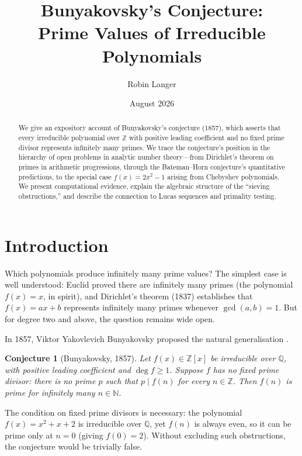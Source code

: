 \documentclass[11pt,a4paper]{article}
\title{Bunyakovsky's Conjecture:\\Prime Values of Irreducible Polynomials}
\author{Robin Langer}
\date{August 2026}
\newtheorem{conjecture}[theorem]{Conjecture}
\newcommand{\Z}{\mathbb{Z}}
\newcommand{\N}{\mathbb{N}}
\newcommand{\Q}{\mathbb{Q}}
\begin{document}
\maketitle

\begin{abstract}
We give an expository account of Bunyakovsky's conjecture (1857), which asserts that every irreducible polynomial over $\Z$ with positive leading coefficient and no fixed prime divisor represents infinitely many primes. We trace the conjecture's position in the hierarchy of open problems in analytic number theory---from Dirichlet's theorem on primes in arithmetic progressions, through the Bateman--Horn conjecture's quantitative predictions, to the special case $f(x) = 2x^2 - 1$ arising from Chebyshev polynomials. We present computational evidence, explain the algebraic structure of the ``sieving obstructions,'' and describe the connection to Lucas sequences and primality testing.
\end{abstract}

\section{Introduction}

Which polynomials produce infinitely many prime values? The simplest case is well understood: Euclid proved there are infinitely many primes (the polynomial $f(x) = x$, in spirit), and Dirichlet's theorem (1837) establishes that $f(x) = ax + b$ represents infinitely many primes whenever $\gcd(a,b) = 1$. But for degree two and above, the question remains wide open.

In 1857, Viktor Yakovlevich Bunyakovsky proposed the natural generalisation \cite{bunyakovsky1857}.

\begin{conjecture}[Bunyakovsky, 1857]\label{conj:bun}
Let $f(x) \in \Z[x]$ be irreducible over $\Q$, with positive leading coefficient and $\deg f \geq 1$. Suppose $f$ has no \emph{fixed prime divisor}: there is no prime $p$ such that $p \mid f(n)$ for every $n \in \Z$. Then $f(n)$ is prime for infinitely many $n \in \N$.
\end{conjecture}

The condition on fixed prime divisors is necessary: the polynomial $f(x) = x^2 + x + 2$ is irreducible over $\Q$, yet $f(n)$ is always even, so it can be prime only at $n = 0$ (giving $f(0) = 2$). Without excluding such obstructions, the conjecture would be trivially false.
\end{document}
